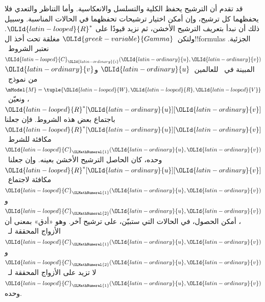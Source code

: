 \documentclass[../../../include/open-logic-section]{subfiles}
\begin{document}


قد تقدم أن الترشيح يحفظ الكلية والتسلسل والانعكاسية. وأما التناظر
والتعدي فلا يحفظهما كل ترشيح، وإن أمكن اختيار ترشيحات تحفظهما في الحالات
المناسبة. وسبيل ذلك أن نبدأ بتعريف الترشيح الأخشن، ثم نزيد قيودًا على
${\OLId{latin-looped}{R}}^*$. ولتكن~${\OLId{greek-variable}{Gamma}}$ مغلقة تحت أخذ ال!!{formula}s الجزئية.
نعتبر الشروط~${\OLId{latin-looped}{C}}_{\OLId{latin-ordinary}{i}}({\OLId{latin-ordinary}{u}},{\OLId{latin-ordinary}{v}})$ المبينة في~
للعالمين~${\OLId{latin-ordinary}{u}}$ و${\OLId{latin-ordinary}{v}}$ من نموذج~$\mModel{M}=\tuple{{\OLId{latin-looped}{W}},{\OLId{latin-looped}{R}},{\OLId{latin-looped}{V}}}$،
ونعيّن~${\OLId{latin-looped}{R}}^*[{\OLId{latin-ordinary}{u}}][{\OLId{latin-ordinary}{v}}]$ باجتماع بعض هذه الشروط. فإن جعلنا
${\OLId{latin-looped}{R}}^*[{\OLId{latin-ordinary}{u}}][{\OLId{latin-ordinary}{v}}]$ مكافئة للشرط~${\OLId{latin-looped}{C}}_{\OLMathNumeral{1}}({\OLId{latin-ordinary}{u}},{\OLId{latin-ordinary}{v}})$ وحده، كان الحاصل الترشيح الأخشن
بعينه. وإن جعلنا~${\OLId{latin-looped}{R}}^*[{\OLId{latin-ordinary}{u}}][{\OLId{latin-ordinary}{v}}]$ مكافئة لاجتماع~${\OLId{latin-looped}{C}}_{\OLMathNumeral{1}}({\OLId{latin-ordinary}{u}},{\OLId{latin-ordinary}{v}})$
و${\OLId{latin-looped}{C}}_{\OLMathNumeral{2}}({\OLId{latin-ordinary}{u}},{\OLId{latin-ordinary}{v}})$، أمكن الحصول، في الحالات التي ستبيّن، على ترشيح آخر.
وهو «أدق» بمعنى أن الأزواج المحققة لـ~${\OLId{latin-looped}{C}}_{\OLMathNumeral{1}}({\OLId{latin-ordinary}{u}},{\OLId{latin-ordinary}{v}})$ و${\OLId{latin-looped}{C}}_{\OLMathNumeral{2}}({\OLId{latin-ordinary}{u}},{\OLId{latin-ordinary}{v}})$
لا تزيد على الأزواج المحققة لـ~${\OLId{latin-looped}{C}}_{\OLMathNumeral{1}}({\OLId{latin-ordinary}{u}},{\OLId{latin-ordinary}{v}})$ وحده.
\end{document}
